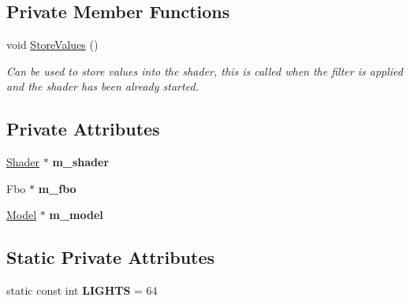 \subsection*{Private Member Functions}
\begin{DoxyCompactItemize}
\item 
void \hyperlink{class_flounder_1_1_renderer_deferred_a617c5f432093bb0ea4c00fcee4146b37}{Store\+Values} ()
\begin{DoxyCompactList}\small\item\em Can be used to store values into the shader, this is called when the filter is applied and the shader has been already started. \end{DoxyCompactList}\end{DoxyCompactItemize}
\subsection*{Private Attributes}
\begin{DoxyCompactItemize}
\item 
\mbox{\label{class_flounder_1_1_renderer_deferred_a67abca0340d6791ff4e0010bc415cc61}} 
\hyperlink{class_flounder_1_1_shader}{Shader} $\ast$ {\bfseries m\+\_\+shader}
\item 
\mbox{\label{class_flounder_1_1_renderer_deferred_a76dac7542d966df72e34dca1b05ed9d5}} 
Fbo $\ast$ {\bfseries m\+\_\+fbo}
\item 
\mbox{\label{class_flounder_1_1_renderer_deferred_a47cd07c2eb1a65661c3b2100d9da5286}} 
\hyperlink{class_flounder_1_1_model}{Model} $\ast$ {\bfseries m\+\_\+model}
\end{DoxyCompactItemize}
\subsection*{Static Private Attributes}
\begin{DoxyCompactItemize}
\item 
\mbox{\label{class_flounder_1_1_renderer_deferred_a7eb7cc8114625fa73a0586f0231bdcab}} 
static const int {\bfseries L\+I\+G\+H\+TS} = 64
\end{DoxyCompactItemize}


